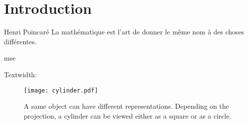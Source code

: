 \chapter{Introduction}\label{ch:introduction}


\begin{chapquote}{Henri Poincaré}
La mathématique est l'art de donner le même nom à des choses différentes.
\end{chapquote}

\lipsum[1-3]
\gls{mse}

Textwidth: \printlength{\textwidth}

\begin{figure}
    \centering
    \texttt{[image: cylinder.pdf]}
    \caption[Cylinder projected as a circle and a square.]{A same object can have different representations. Depending on the projection, a cylinder can be viewed either as a square or as a circle.}
\end{figure}



\cleardoublepage

